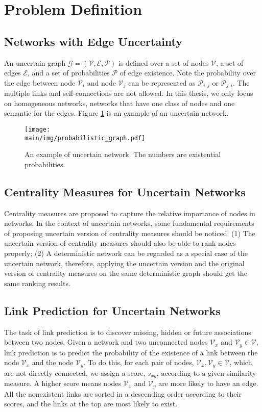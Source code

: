 \documentclass[\main/thesis.tex]{subfiles}
\begin{document}
\section{Problem Definition}
\subsection{Networks with Edge Uncertainty} \label{Uncertain-Network-Definition}
An uncertain graph $\mathcal{G = (V,E,P)}$ is defined over a set of nodes $\mathcal{V}$, a set of edges $\mathcal{E}$, and a set of probabilities $\mathcal{P}$ of edge existence. Note the probability over the edge between node $\mathcal{V}_i$ and node $\mathcal{V}_j$ can be represented as $\mathcal{P}_{i,j}$ or $\mathcal{P}_{j,i}$. The multiple links and self-connections are not allowed. In this thesis, we only focus on homogeneous networks, networks that have one class of nodes and one semantic for the edges. Figure \ref{uncertain_network_example} is an example of an uncertain network.
\begin{figure}
\centering
\texttt{[image: \\main/img/probabilistic\_graph.pdf]}
\caption{An example of uncertain network. The numbers are existential probabilities.}
\label{uncertain_network_example}
\end{figure}

\subsection{Centrality Measures for Uncertain Networks}
Centrality measures are proposed to capture the relative importance of nodes in networks. In the context of uncertain networks, some fundamental requirements of proposing uncertain version of centrality measures should be noticed: (1) The uncertain version of centrality measures should also be able to rank nodes properly; (2) A deterministic network can be regarded as a special case of the uncertain network, therefore, applying the uncertain version and the original version of centrality measures on the same deterministic graph should get the same ranking results.

\subsection{Link Prediction for Uncertain Networks}
The task of link prediction is to discover missing, hidden or future associations between two nodes. Given a network and two unconnected nodes $\mathcal{V}_x$ and $\mathcal{V}_y \in \mathcal{V}$, link prediction is to predict the probability of the existence of a link between the node $\mathcal{V}_x$ and the node $\mathcal{V}_y$. To do this, for each pair of nodes, $\mathcal{V}_x,\mathcal{V}_y\in \mathcal{V}$, which are not directly connected, we assign a score, $s_{xy}$, according to a given similarity measure. A higher score means nodes $\mathcal{V}_x$ and $\mathcal{V}_y$ are more likely to have an edge. All the nonexistent links are sorted in a descending order according to their scores, and the links at the top are most likely to exist.
\end{document}
